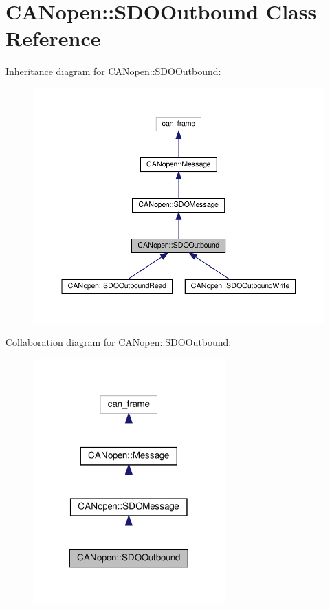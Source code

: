\hypertarget{class_c_a_nopen_1_1_s_d_o_outbound}{}\section{C\+A\+Nopen\+:\+:S\+D\+O\+Outbound Class Reference}
\label{class_c_a_nopen_1_1_s_d_o_outbound}


Inheritance diagram for C\+A\+Nopen\+:\+:S\+D\+O\+Outbound\+:\nopagebreak
\begin{figure}[H]
\begin{center}
\leavevmode
\includegraphics[width=350pt]{class_c_a_nopen_1_1_s_d_o_outbound__inherit__graph}
\end{center}
\end{figure}


Collaboration diagram for C\+A\+Nopen\+:\+:S\+D\+O\+Outbound\+:\nopagebreak
\begin{figure}[H]
\begin{center}
\leavevmode
\includegraphics[width=209pt]{class_c_a_nopen_1_1_s_d_o_outbound__coll__graph}
\end{center}
\end{figure}
